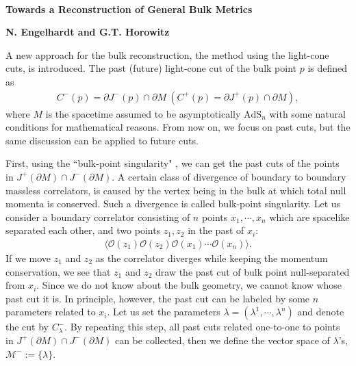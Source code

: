 \documentclass[12pt]{article}
\date{}
\begin{document}
{\Large{}\\[2mm]
\textbf{Towards a Reconstruction of General Bulk Metrics\cite{Engelhardt:2016wgb}
}
}

\noindent
\hfill
\textbf{N. Engelhardt and G.T. Horowitz}%

\vspace{12pt}
A new approach for the bulk reconstruction, the method using the light-cone cuts, is introduced.
The past (future) light-cone cut of the bulk point $p$ is defined as
\begin{align}
	C^-(p) = \partial J^-(p)\cap \partial M~(C^+(p) = \partial J^+(p)\cap \partial M),
\end{align}
where $M$ is the spacetime assumed to be asymptotically $\mathrm{AdS}_n$ with some natural conditions 
for mathematical reasons.
From now on, we focus on past cuts, but the same discussion can be applied to future cuts.

First, using the ``bulk-point singularity" \cite{Maldacena:2015iua}, we can get the past cuts of the points 
in $J^+(\partial M)\cap J^-(\partial M)$.
A certain class of divergence of boundary to boundary massless correlators,
is caused by the vertex being in the bulk at which total null momenta is conserved.
Such a divergence is called bulk-point singularity.
Let us consider a boundary correlator consisting of $n$ points $x_1,\cdots,x_n$ which are spacelike separated each other, 
and two points $z_1, z_2$ in the past of $x_i$:
\begin{align}
	\langle\mathcal O(z_1)\mathcal O(z_2)\mathcal O(x_1)\cdots\mathcal O(x_n)\rangle.
\end{align}
If we move $z_1$ and $z_2$ as the correlator diverges while keeping the momentum conservation,
we see that $z_1$ and $z_2$ draw the past cut of bulk point null-separated from $x_i$.
Since we do not know about the bulk geometry, we cannot know whose past cut it is.
In principle, however, the past cut can be labeled by some $n$ parameters related to $x_i$.
Let us set the parameters $\lambda = (\lambda^1,\cdots,\lambda^n)$ and denote the cut by $C^-_\lambda$.
By repeating this step, all past cuts related one-to-one to points in $J^+(\partial M)\cap J^-(\partial M)$ can be collected, 
then we define the vector space of $\lambda$'s, $\mathcal M^- := \{\lambda\}$.
\end{document}
